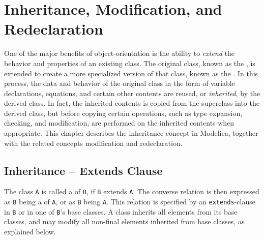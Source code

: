 \chapter{Inheritance, Modification, and Redeclaration}\label{inheritance-modification-and-redeclaration}

One of the major benefits of object-orientation is the ability to \emph{extend} the behavior and properties of an existing class.
The original class, known as the , is extended to create a more specialized version of that class, known as the .
In this process, the data and behavior of the original class in the form of variable declarations, equations, and certain other contents are reused, or \emph{inherited}, by the derived class.
In fact, the inherited contents is copied from the superclass into the derived class, but before copying certain operations, such as type expansion, checking, and modification, are performed on the inherited contents when appropriate.
This chapter describes the inheritance concept in Modelica, together with the related concepts modification and redeclaration.


\section{Inheritance -- Extends Clause}\label{inheritance-extends-clause}

The class \lstinline!A! is called a  of \lstinline!B!, if \lstinline!B! extends \lstinline!A!.
The converse relation is then expressed as \lstinline!B! being a  of \lstinline!A!, or as \lstinline!B! being  \lstinline!A!.
This relation is specified by an \lstinline!extends!-clause in \lstinline!B! or in one of \lstinline!B!'s base classes.
A class inherits all elements from its base classes, and may modify all non-final elements inherited from base classes, as explained below.

